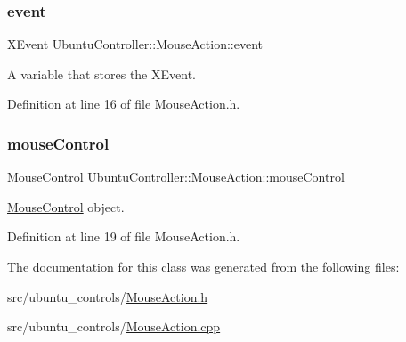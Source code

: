 \subsubsection{\texorpdfstring{event}{event}}
{\footnotesize\ttfamily X\+Event Ubuntu\+Controller\+::\+Mouse\+Action\+::event\hspace{0.3cm}{\ttfamily [private]}}



A variable that stores the X\+Event. 



Definition at line 16 of file Mouse\+Action.\+h.

\mbox{\label{class_ubuntu_controller_1_1_mouse_action_a8c5da1d5bd3de8f926fc132335cf9156}} 
\subsubsection{\texorpdfstring{mouse\+Control}{mouseControl}}
{\footnotesize\ttfamily \hyperlink{class_ubuntu_controller_1_1_mouse_control}{Mouse\+Control} Ubuntu\+Controller\+::\+Mouse\+Action\+::mouse\+Control\hspace{0.3cm}{\ttfamily [private]}}



\hyperlink{class_ubuntu_controller_1_1_mouse_control}{Mouse\+Control} object. 



Definition at line 19 of file Mouse\+Action.\+h.



The documentation for this class was generated from the following files\+:\begin{DoxyCompactItemize}
\item 
src/ubuntu\+\_\+controls/\hyperlink{_mouse_action_8h}{Mouse\+Action.\+h}\item 
src/ubuntu\+\_\+controls/\hyperlink{_mouse_action_8cpp}{Mouse\+Action.\+cpp}\end{DoxyCompactItemize}
